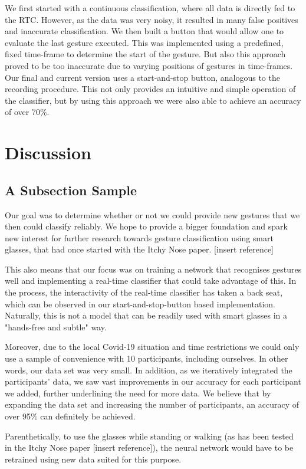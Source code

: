 \documentclass[runningheads]{llncs}
\begin{document}
We first started with a continuous classification, where all data is directly fed to the RTC. However, as the data was very noisy, it resulted in many false positives and inaccurate classification. We then built a button that would allow one to evaluate the last gesture executed. This was implemented using a predefined, fixed time-frame to determine the start of the gesture. But also this approach proved to be too inaccurate due to varying positions of gestures in time-frames. Our final and current version uses a start-and-stop button, analogous to the recording procedure. This not only provides an intuitive and simple operation of the classifier, but by using this approach we were also able to achieve an accuracy of over 70\%.

\section{Discussion}
\subsection{A Subsection Sample}
Our goal was to determine whether or not we could provide new gestures that we then could classify reliably. We hope to provide a bigger foundation and spark new interest for further research towards gesture classification using smart glasses, that had once started with the Itchy Nose paper. [insert reference]

This also means that our focus was on training a network that recognises gestures well and implementing a real-time classifier that could take advantage of this. In the process, the interactivity of the real-time classifier has taken a back seat, which can be observed in our start-and-stop-button based implementation. Naturally, this is not a model that can be readily used with smart glasses in a "hands-free and subtle" way.

Moreover, due to the local Covid-19 situation and time restrictions we could only use a sample of convenience with 10 participants, including ourselves. In other words, our data set was very small. In addition, as we iteratively integrated the participants' data, we saw vast improvements in our accuracy for each participant we added, further underlining the need for more data. We believe that by expanding the data set and increasing the number of participants, an accuracy of over 95\% can definitely be achieved.

Parenthetically, to use the glasses while standing or walking (as has been tested in the Itchy Nose paper [insert reference]), the neural network would have to be retrained using new data suited for this purpose.
\end{document}

